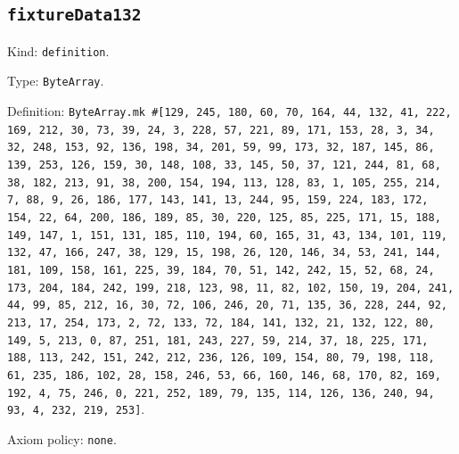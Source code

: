\documentclass[11pt]{article}
\begin{document}
\subsection*{\texttt{fixtureData132}}
\noindent Kind: \texttt{definition}.\par
\noindent Type: \texttt{ByteArray}.\par
\noindent Definition: \texttt{ByteArray.mk \#[129, 245, 180, 60, 70, 164, 44, 132, 41, 222, 169, 212, 30, 73, 39, 24, 3, 228, 57, 221, 89, 171, 153, 28, 3, 34, 32, 248, 153, 92, 136, 198, 34, 201, 59, 99, 173, 32, 187, 145, 86, 139, 253, 126, 159, 30, 148, 108, 33, 145, 50, 37, 121, 244, 81, 68, 38, 182, 213, 91, 38, 200, 154, 194, 113, 128, 83, 1, 105, 255, 214, 7, 88, 9, 26, 186, 177, 143, 141, 13, 244, 95, 159, 224, 183, 172, 154, 22, 64, 200, 186, 189, 85, 30, 220, 125, 85, 225, 171, 15, 188, 149, 147, 1, 151, 131, 185, 110, 194, 60, 165, 31, 43, 134, 101, 119, 132, 47, 166, 247, 38, 129, 15, 198, 26, 120, 146, 34, 53, 241, 144, 181, 109, 158, 161, 225, 39, 184, 70, 51, 142, 242, 15, 52, 68, 24, 173, 204, 184, 242, 199, 218, 123, 98, 11, 82, 102, 150, 19, 204, 241, 44, 99, 85, 212, 16, 30, 72, 106, 246, 20, 71, 135, 36, 228, 244, 92, 213, 17, 254, 173, 2, 72, 133, 72, 184, 141, 132, 21, 132, 122, 80, 149, 5, 213, 0, 87, 251, 181, 243, 227, 59, 214, 37, 18, 225, 171, 188, 113, 242, 151, 242, 212, 236, 126, 109, 154, 80, 79, 198, 118, 61, 235, 186, 102, 28, 158, 246, 53, 66, 160, 146, 68, 170, 82, 169, 192, 4, 75, 246, 0, 221, 252, 189, 79, 135, 114, 126, 136, 240, 94, 93, 4, 232, 219, 253]}.\par
\noindent Axiom policy: \texttt{none}.\par
\end{document}

